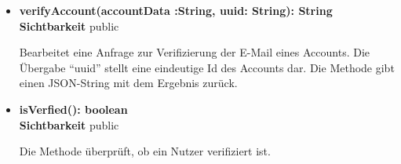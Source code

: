 \begin{itemize}
\item \textbf{verifyAccount(accountData :String, uuid: String): String}\hfill\\
\textbf{Sichtbarkeit} public

Bearbeitet eine Anfrage zur Verifizierung der E-Mail eines Accounts. Die Übergabe ``uuid'' stellt eine eindeutige Id des Accounts dar. Die Methode gibt einen JSON-String mit dem Ergebnis zurück.

\item \textbf{isVerfied(): boolean}\hfill\\
\textbf{Sichtbarkeit} public

Die Methode überprüft, ob ein Nutzer verifiziert ist.

\end{itemize}